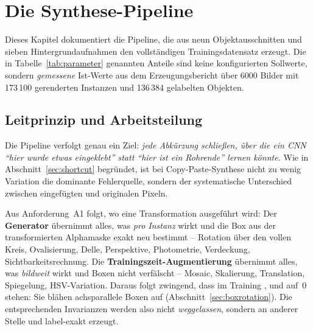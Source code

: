 \chapter{Die Synthese-Pipeline}
\label{kap:pipeline}

Dieses Kapitel dokumentiert die Pipeline, die aus neun Objektausschnitten und
sieben Hintergrundaufnahmen den vollständigen Trainingsdatensatz erzeugt. Die in
Tabelle~\ref{tab:parameter} genannten Anteile sind keine konfigurierten
Sollwerte, sondern \emph{gemessene} Ist-Werte aus dem Erzeugungsbericht
 über 6000 Bilder mit 173\,100
gerenderten Instanzen und 136\,384 gelabelten Objekten.

\section{Leitprinzip und Arbeitsteilung}
\label{sec:leitprinzip}

 Die Pipeline verfolgt genau ein Ziel: \emph{jede Abkürzung
schließen, über die ein CNN \enquote{hier wurde etwas eingeklebt} statt
\enquote{hier ist ein Rohrende} lernen könnte.} Wie in
Abschnitt~\ref{sec:shortcut} begründet, ist bei Copy-Paste-Synthese nicht zu
wenig Variation die dominante Fehlerquelle, sondern der systematische
Unterschied zwischen eingefügten und originalen Pixeln.

 Aus Anforderung~A1 folgt, wo eine Transformation
ausgeführt wird: Der \textbf{Generator} übernimmt alles, was \emph{pro Instanz}
wirkt und die Box aus der transformierten Alphamaske exakt neu bestimmt --
Rotation über den vollen Kreis, Ovalisierung, Delle, Perspektive, Photometrie,
Verdeckung, Sichtbarkeitsrechnung. Die \textbf{Trainingszeit-Augmentierung}
übernimmt alles, was \emph{bildweit} wirkt und Boxen nicht verfälscht -- Mosaic,
Skalierung, Translation, Spiegelung, HSV-Variation. Daraus folgt zwingend, dass
im Training ,  und  auf~0 stehen: Sie
blähen achsparallele Boxen auf (Abschnitt~\ref{sec:boxrotation}). Die
entsprechenden Invarianzen werden also nicht \emph{weggelassen}, sondern an
anderer Stelle und label-exakt erzeugt.

